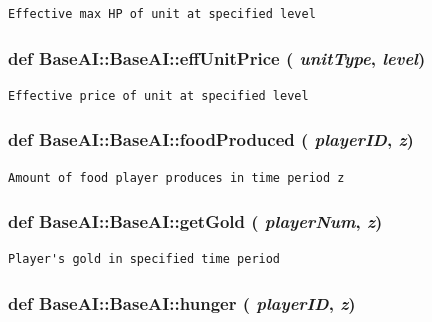 \footnotesize\begin{verbatim}Effective max HP of unit at specified level
\end{verbatim}
\normalsize
 \hypertarget{classBaseAI_1_1BaseAI_2c1cbac9339eaa991103a57645e15988}{
\subsubsection[{effUnitPrice}]{\setlength{\rightskip}{0pt plus 5cm}def BaseAI::BaseAI::effUnitPrice ( {\em unitType}, \/   {\em level})}}
\label{classBaseAI_1_1BaseAI_2c1cbac9339eaa991103a57645e15988}




\footnotesize\begin{verbatim}Effective price of unit at specified level
\end{verbatim}
\normalsize
 \hypertarget{classBaseAI_1_1BaseAI_ac24297bd8420f5a88fea0f3d37bef0d}{
\subsubsection[{foodProduced}]{\setlength{\rightskip}{0pt plus 5cm}def BaseAI::BaseAI::foodProduced ( {\em playerID}, \/   {\em z})}}
\label{classBaseAI_1_1BaseAI_ac24297bd8420f5a88fea0f3d37bef0d}




\footnotesize\begin{verbatim}Amount of food player produces in time period z
\end{verbatim}
\normalsize
 \hypertarget{classBaseAI_1_1BaseAI_6d1450fe6668e21e1a9e76fb4ed091b4}{
\subsubsection[{getGold}]{\setlength{\rightskip}{0pt plus 5cm}def BaseAI::BaseAI::getGold ( {\em playerNum}, \/   {\em z})}}
\label{classBaseAI_1_1BaseAI_6d1450fe6668e21e1a9e76fb4ed091b4}




\footnotesize\begin{verbatim}Player's gold in specified time period
\end{verbatim}
\normalsize
 \hypertarget{classBaseAI_1_1BaseAI_38e07336c6f26c483da30f2098537e1a}{
\subsubsection[{hunger}]{\setlength{\rightskip}{0pt plus 5cm}def BaseAI::BaseAI::hunger ( {\em playerID}, \/   {\em z})}}
\label{classBaseAI_1_1BaseAI_38e07336c6f26c483da30f2098537e1a}




